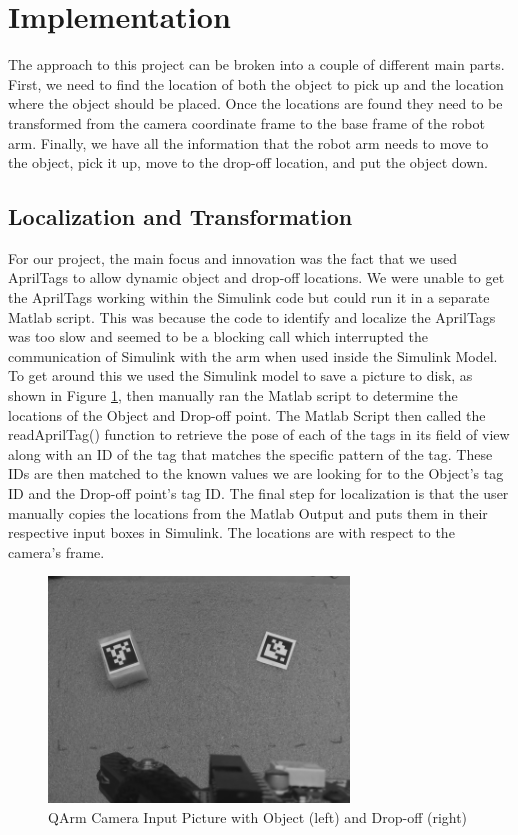 \section{Implementation}

The approach to this project can be broken into a couple of different main parts. First, we need to find the location of both the object to pick up and the location where the object should be placed. Once the locations are found they need to be transformed from the camera coordinate frame to the base frame of the robot arm. Finally, we have all the information that the robot arm needs to move to the object, pick it up, move to the drop-off location, and put the object down.

\subsection{Localization and Transformation}

For our project, the main focus and innovation was the fact that we used AprilTags to allow dynamic object and drop-off locations. We were unable to get the AprilTags working within the Simulink code but could run it in a separate Matlab script. This was because the code to identify and localize the AprilTags was too slow and seemed to be a blocking call which interrupted the communication of Simulink with the arm when used inside the Simulink Model. To get around this we used the Simulink model to save a picture to disk, as shown in Figure \ref{Fig:QARM_CamPic}, then manually ran the Matlab script to determine the locations of the Object and Drop-off point. The Matlab Script then called the readAprilTag() function to retrieve the pose of each of the tags in its field of view along with an ID of the tag that matches the specific pattern of the tag. These IDs are then matched to the known values we are looking for to the Object's tag ID and the Drop-off point's tag ID. The final step for localization is that the user manually copies the locations from the Matlab Output and puts them in their respective input boxes in Simulink. The locations are with respect to the camera's frame.

\begin{figure}[htb]
\includegraphics[width=8cm]{Figures/Input.png}
\caption{QArm Camera Input Picture with Object (left) and Drop-off (right)}
\centering
\label{Fig:QARM_CamPic}
\end{figure}

